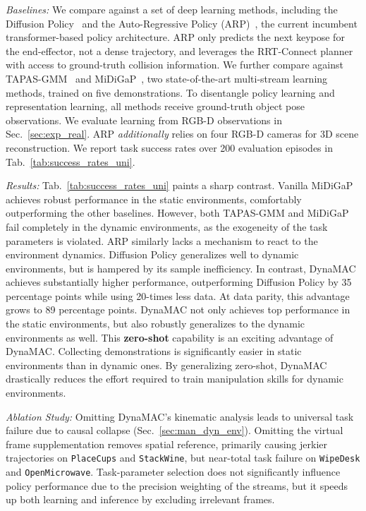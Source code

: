 \documentclass[letterpaper, 10 pt, journal, twoside]{IEEEtran}
\renewcommand{\secref}[1]{Sec.~\ref{#1}}
\newcommand{\tabref}[1]{Tab.~\ref{#1}}
\newcommand{\para}[1]{\parskip=5pt\noindent\textit{#1}}
\newcommand{\ourmethod}{DynaMAC\xspace}
\begin{document}
\para{Baselines:} 
We compare against a set of deep learning methods, including the Diffusion Policy~\cite{chi2023diffusionpolicy} and the Auto-Regressive Policy (ARP)~\cite{zhang2024arp}, the current incumbent transformer-based policy architecture.
%
%
ARP only predicts the next keypose for the end-effector, not a dense trajectory, and leverages the RRT-Connect planner~\cite{kuffner2000rrtc} with access to ground-truth collision information.
We further compare against TAPAS-GMM~\cite{von2024art} and MiDiGaP~\cite{von2025unreasonable}, two state-of-the-art multi-stream learning methods, trained on five demonstrations.
To disentangle policy learning and representation learning, all methods receive ground-truth object pose observations.
We evaluate learning from RGB-D observations in \secref{sec:exp_real}.
ARP \emph{additionally} relies on four RGB-D cameras for 3D scene reconstruction.
We report task success rates over 200 evaluation episodes in \tabref{tab:success_rates_uni}.

\para{Results: }
\tabref{tab:success_rates_uni} paints a sharp contrast.
Vanilla MiDiGaP achieves robust performance in the static environments, comfortably outperforming the other baselines.
However, both TAPAS-GMM and MiDiGaP fail completely in the dynamic environments, as the exogeneity of the task parameters is violated.
ARP similarly lacks a mechanism to react to the environment dynamics.
%
%
Diffusion Policy generalizes well to dynamic environments, but is hampered by its sample inefficiency.
%
%
In contrast, \ourmethod{} achieves substantially higher performance, outperforming Diffusion Policy by 35 percentage points while using 20-times less data.
At data parity, this advantage grows to 89 percentage points.
\ourmethod{} not only achieves top performance in the static environments, but also robustly generalizes to the dynamic environments as well.
This \textbf{zero-shot} capability is an exciting advantage of \ourmethod{}.
Collecting demonstrations is significantly easier in static environments than in dynamic ones.
By generalizing zero-shot, \ourmethod{} drastically reduces the effort required to train manipulation skills for dynamic environments.

\para{Ablation Study:} Omitting \ourmethod{}'s kinematic analysis leads to universal task failure due to causal collapse (\secref{sec:man_dyn_env}).
Omitting the virtual frame supplementation removes spatial reference, primarily causing jerkier trajectories on \texttt{PlaceCups} and \texttt{StackWine}, but near-total task failure on \texttt{WipeDesk} and \texttt{OpenMicrowave}.
Task-parameter selection does not significantly influence policy performance due to the precision weighting of the streams, but it speeds up both learning and inference by excluding irrelevant frames.
\end{document}
